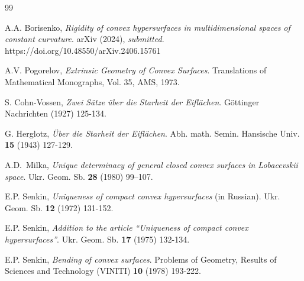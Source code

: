 \documentclass[11pt,oneside]{amsart}
\theoremstyle{theorem}
\theoremstyle{definition}
\theoremstyle{remark}
\begin{document}


\begin{thebibliography}{99}

A.A. Borisenko, \textit{Rigidity of convex hypersurfaces in multidimensional spaces of constant curvature}. arXiv (2024), \emph{submitted}. https://doi.org/10.48550/arXiv.2406.15761

A.V. Pogorelov, \textit{Extrinsic Geometry of Convex Surfaces}. Translations of Mathematical Monographs, Vol. 35, AMS, 1973.
    
S. Cohn-Vossen, \textit{Zwei S\"atze \"uber die Starheit der Eifl\"achen}. G\"ottinger Nachrichten (1927) 125-134.

G. Herglotz, \textit{\"Uber die Starheit der Eifl\"achen}. Abh. math. Semin. Hansische Univ. \textbf{15} (1943) 127-129.

A.D.~Milka, \textit{Unique determinacy of general closed convex surfaces in Lobacevskii space}. Ukr. Geom. Sb. \textbf{28} (1980) 99--107.

E.P. Senkin, \textit{Uniqueness of compact convex hypersurfaces} (in Russian). Ukr. Geom. Sb. \textbf{12} (1972) 131-152.

E.P. Senkin, \textit{Addition to the article ``Uniqueness of compact convex hypersurfaces''}. Ukr. Geom. Sb. \textbf{17} (1975) 132-134.

E.P. Senkin, \textit{Bending of convex surfaces}. Problems of Geometry, Results of Sciences and Technology (VINITI) \textbf{10} (1978) 193-222.


\end{thebibliography}
\end{document}
